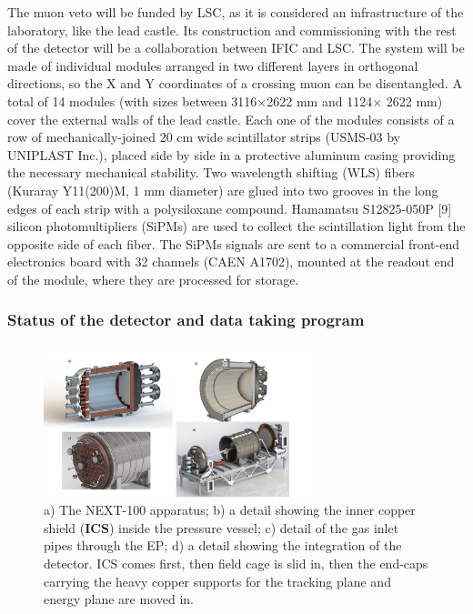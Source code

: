 The muon veto will be funded by LSC, as it is considered an infrastructure of the laboratory, like the lead castle. Its construction and commissioning with the rest of the detector will be a collaboration between IFIC and LSC. The system will be made of individual modules arranged in two different layers in orthogonal directions, so the X and Y coordinates of a crossing muon can be disentangled. A total of 14 modules (with sizes between 3116$\times$2622 mm and 1124$\times$ 2622 mm) cover the external walls of the lead castle. Each one of the modules consists of a row of mechanically-joined 20 cm wide scintillator strips  (USMS-03 by UNIPLAST Inc.), placed side by side in a protective aluminum casing providing the necessary mechanical stability. Two wavelength shifting (WLS) fibers (Kuraray Y11(200)M, 1 mm diameter) are glued into two grooves in the long edges of each strip with a polysiloxane compound. Hamamatsu S12825-050P [9] silicon photomultipliers (SiPMs) are used to collect the scintillation light from the opposite side of each fiber. The SiPMs signals are sent to a commercial front-end electronics board with 32 channels (CAEN A1702), mounted at the readout end of the module, where  they are processed for storage.

\subsubsection{Status of the detector and data taking program}

\begin{figure}[!htb]
\centering
\includegraphics[width=0.7\textwidth]{img2/collage.pdf}
\caption{\small a) The NEXT-100 apparatus; b) a detail showing the inner copper shield ({\bf ICS}) inside the pressure vessel; c) detail of the gas inlet pipes through the EP; d) a detail showing the integration of the detector. ICS comes first, then field cage is slid in, then the end-caps carrying the heavy copper supports for the tracking plane and energy plane are moved in.} 
\label{fig.n100e}
\end{figure} 


